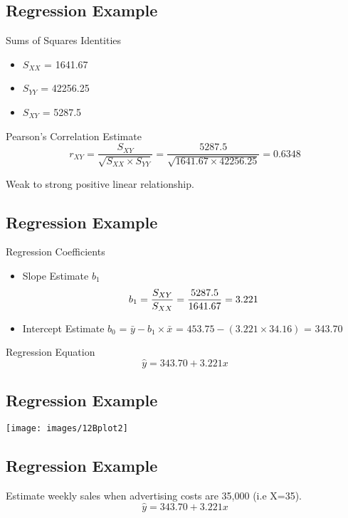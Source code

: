 	
	
	\subsection{Regression Example}
	Sums of Squares Identities
	\begin{itemize}
		\item $S_{XX}$ = 1641.67
		\item $S_{YY}$ = 42256.25
		\item $S_{XY}$ = 5287.5
	\end{itemize}
	Pearson's Correlation Estimate
	\[ r_{XY} = \frac{S_{XY}}{\sqrt{S_{XX} \times S_{YY}}} = \frac{5287.5}{\sqrt{1641.67 \times 42256.25}} = 0.6348 \]
	
	Weak to strong positive linear relationship.
	
	
	\subsection{Regression Example}
	Regression Coefficients
	\begin{itemize}
		\item Slope Estimate $b_1$
		\[b_1 = \frac{S_{XY}}{S_{XX}} = {5287.5 \over 1641.67} = 3.221\]
		\item Intercept Estimate $b_0$ = $\bar{y} - b_1 \times \bar{x}$ = $453.75-(3.221\times 34.16)$ = 343.70
	\end{itemize}
	Regression Equation
	\[ \hat{y} = 343.70 + 3.221x \]
	
	
	
	\subsection{Regression Example}
	\begin{center}
		\texttt{[image: images/12Bplot2]}
	\end{center}
	
	
	
	\subsection{Regression Example}
	Estimate weekly sales when advertising costs are 35,000 (i.e X=35).
	\[ \hat{y} = 343.70 + 3.221x \]
	
